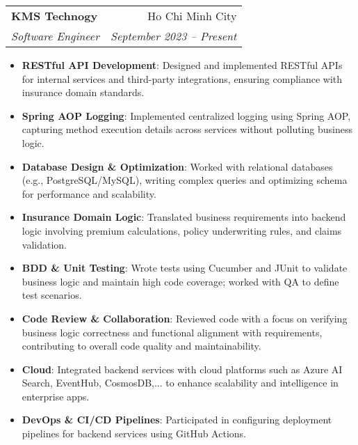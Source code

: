 \documentclass[letterpaper,11pt]{article}
\makeatletter
\newcommand{\resumeItem}[2]{
  \item\small{
    \textbf{#1}{: #2 \vspace{-2pt}}
  }
}
\newcommand{\resumeSubheading}[4]{
  \vspace{-1pt}\item
    \begin{tabular*}{0.97\textwidth}[t]{l@{\extracolsep{\fill}}r}
      \textbf{#1} & #2 \\
      \textit{\small#3} & \textit{\small #4} \\
    \end{tabular*}\vspace{-5pt}
}
\newcommand{\resumeSubSubheading}[2]{
    \begin{tabular*}{0.97\textwidth}{l@{\extracolsep{\fill}}r}
      \textit{\small#1} & \textit{\small #2} \\
    \end{tabular*}\vspace{-5pt}
}
\newcommand{\resumeItemListStart}{\begin{itemize}}
\newcommand{\resumeItemListEnd}{\end{itemize}\vspace{-5pt}}
\makeatother
\begin{document}
    \resumeSubheading
      {KMS Technogy}{Ho Chi Minh City}
      {Software Engineer}{September 2023 -- Present}
      \resumeItemListStart
        \resumeItem{RESTful API Development}
          {Designed and implemented RESTful APIs for internal services and third-party integrations, ensuring compliance with insurance domain standards.}
        \resumeItem{Spring AOP Logging}
          {Implemented centralized logging using Spring AOP, capturing method execution details across services without polluting business logic.}
        \resumeItem{Database Design \& Optimization}
          {Worked with relational databases (e.g., PostgreSQL/MySQL), writing complex queries and optimizing schema for performance and scalability.}
        \resumeItem{Insurance Domain Logic}
          {Translated business requirements into backend logic involving premium calculations, policy underwriting rules, and claims validation.}
        \resumeItem{BDD \& Unit Testing}
          {Wrote tests using Cucumber and JUnit to validate business logic and maintain high code coverage; worked with QA to define test scenarios.}
        \resumeItem{Code Review \& Collaboration}
          {Reviewed code with a focus on verifying business logic correctness and functional alignment with requirements, contributing to overall code quality and maintainability.}        
        \resumeItem{Cloud}
          {Integrated backend services with cloud platforms such as Azure AI Search, EventHub, CosmosDB,... to enhance scalability and intelligence in enterprise apps.}
        \resumeItem{DevOps \& CI/CD Pipelines}
          {Participated in configuring deployment pipelines for backend services using GitHub Actions.}
      \resumeItemListEnd
      

\end{document}
